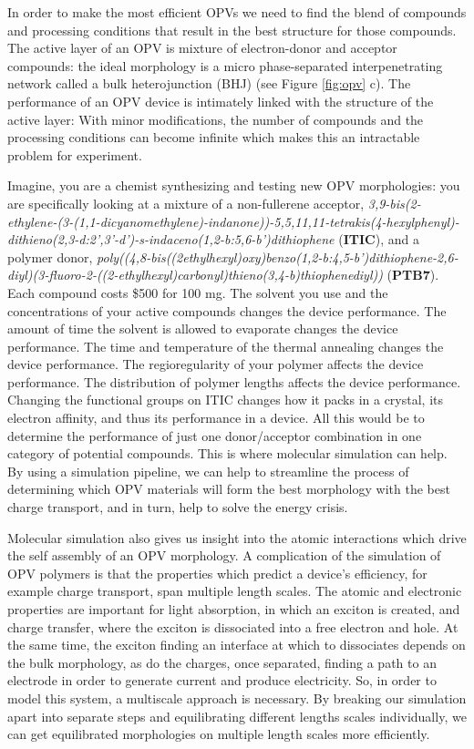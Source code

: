 In order to make the most efficient OPVs we need to find the blend of compounds and processing conditions that result in the best structure for those compounds.
The active layer of an OPV is mixture of electron-donor and acceptor compounds: the ideal morphology is a micro phase-separated interpenetrating network called a bulk heterojunction (BHJ) (see Figure \ref{fig:opv} c).
The performance of an OPV device is intimately linked with the structure of the active layer:
With minor modifications, the number of compounds and the processing conditions can become infinite which makes this an intractable problem for experiment.

Imagine, you are a chemist synthesizing and testing new OPV morphologies: you are specifically looking at a mixture of a non-fullerene acceptor, \textit{3,9-bis(2-ethylene-(3-(1,1-dicyanomethylene)-indanone))-5,5,11,11-tetrakis(4-hexylphenyl)-dithieno(2,3-d:2',3'-d')-s-indaceno(1,2-b:5,6-b')dithiophene} (\textbf{ITIC}), and a polymer donor, \textit{poly((4,8-bis((2ethylhexyl)oxy)benzo(1,2-b:4,5-b')dithiophene-2,6-diyl)(3-fluoro-2-((2-ethylhexyl)carbonyl)thieno(3,4-b)thiophenediyl))} (\textbf{PTB7}). 
Each compound costs \$500 for 100 mg\cite{sigmaaldrich}.
The solvent you use and the concentrations of your active compounds changes the device performance\cite{Hoppe2004a}.
The amount of time the solvent is allowed to evaporate changes the device performance\cite{Li2007}.
The time and temperature of the thermal annealing changes the device performance\cite{Ma2005}.
The regioregularity of your polymer affects the device performance\cite{Kim2006}.
The distribution of polymer lengths affects the device performance\cite{Zhao2013b}.
Changing the functional groups on ITIC changes how it packs in a crystal, its electron affinity, and thus its performance in a device\cite{Swick2019a}.
All this would be to determine the performance of just one donor/acceptor combination in one category of potential compounds\cite{Dou2013}.
This is where molecular simulation can help.
By using a simulation pipeline, we can help to streamline the process of determining which OPV materials will form the best morphology with the best charge transport, and in turn, help to solve the energy crisis.

Molecular simulation also gives us insight into the atomic interactions which drive the self assembly of an OPV morphology.
A complication of the simulation of OPV polymers is that the properties which predict a device's efficiency, for example charge transport, span multiple length scales.
The atomic and electronic properties are important for light absorption, in which an exciton is created, and charge transfer, where the exciton is dissociated into a free electron and hole\cite{Scharber2006a,Hoppe2004,Mazzio2015}.
At the same time, the exciton finding an interface at which to dissociates depends on the bulk morphology, as do the charges, once separated, finding a path to an electrode in order to generate current and produce electricity.
So, in order to model this system, a multiscale approach is necessary.
By breaking our simulation apart into separate steps and equilibrating different lengths scales individually, we can get equilibrated morphologies on multiple length scales more efficiently.

